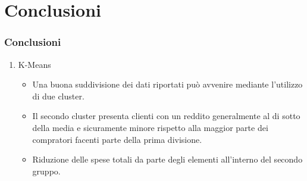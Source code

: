 \section{Conclusioni}
\begin{frame}[fragile]
\frametitle{Conclusioni}
\begin{enumerate}
    \item K-Means
    \begin{itemize}
         \item Una buona suddivisione dei dati riportati può avvenire mediante l'utilizzo di due cluster.
    \item Il secondo cluster presenta clienti con un reddito generalmente al di sotto della media e sicuramente minore rispetto alla maggior parte dei compratori facenti parte della prima divisione.
    \item Riduzione delle spese totali da parte degli elementi all'interno del secondo gruppo.
    \end{itemize}
\end{enumerate}
\end{frame}


